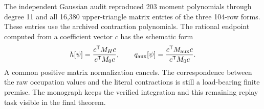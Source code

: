 The independent Gaussian audit reproduced 203 moment polynomials through degree 11 and all 16,380 upper-triangle matrix entries of the three 104-row forms. These entries use the archived contraction polynomials. The rational endpoint computed from a coefficient vector $c$ has the schematic form
\[
 h[\psi]=\frac{c^{\mathsf T}M_Hc}{c^{\mathsf T}M_0c},
 \qquad
 q_{\rm aux}[\psi]=\frac{c^{\mathsf T}M_{\rm aux}c}{c^{\mathsf T}M_0c}.
\]
A common positive matrix normalization cancels. The correspondence between the raw occupation values and the literal contractions is still a load-bearing finite premise. The monograph keeps the verified integration and this remaining replay task visible in the final theorem.
